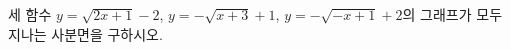 \hspace*{2mm}\begin{minipage}[t]{\dimexpr\linewidth-2mm\relax}\vspace{0pt}
세 함수 $y=\sqrt{2x+1}-2$, $y=-\sqrt{x+3}+1$, $y=-\sqrt{-x+1}+2$의 그래프가 모두 지나는 사분면을 구하시오.\end{minipage}
